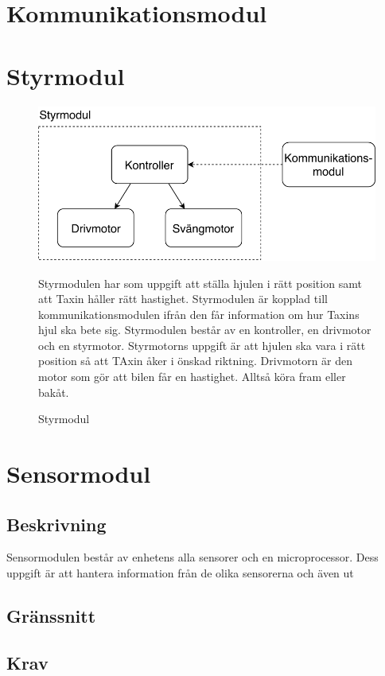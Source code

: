 \documentclass[kravspec/krav.tex]{subfiles}
\begin{document}
\section{Kommunikationsmodul}

\section{Styrmodul}
\begin{figure}[h]
    \centering
    \includegraphics[width=0.6\linewidth]{kravspec/figures/styrmodul.pdf}
    \caption{Styrmodul}
Styrmodulen har som uppgift att ställa hjulen i rätt position samt att Taxin håller rätt hastighet. Styrmodulen är kopplad till kommunikationsmodulen ifrån den får information om hur Taxins hjul ska bete sig. Styrmodulen består av en kontroller, en drivmotor och en styrmotor. Styrmotorns uppgift är att hjulen ska vara i rätt position så att TAxin åker i önskad riktning. Drivmotorn är den motor som gör att bilen får en hastighet. Alltså köra fram eller bakåt.
    \label{fig:styrmodul}
\end{figure}

\section{Sensormodul}
\subsection{Beskrivning}
Sensormodulen består av enhetens alla sensorer och en microprocessor. Dess
uppgift är att hantera information från de olika sensorerna och även
ut
\subsection{Gränssnitt}
\subsection{Krav}
\end{document}
